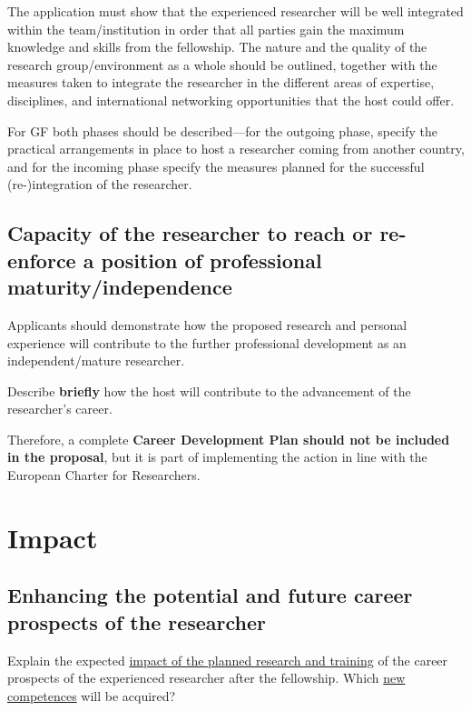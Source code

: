 \noindent
The application must show that the experienced researcher will be well integrated within the team/institution in order that all parties gain the maximum knowledge and skills from the fellowship.
The nature and the quality of the research group/environment as a whole should be outlined, 
together with the measures taken to integrate the researcher in the different areas of expertise, disciplines, and international networking opportunities that the host could offer.

\medskip\noindent
For GF both phases should be described\----for the outgoing phase, specify the practical arrangements in place to host a researcher coming from another country, 
and for the incoming phase specify the measures planned for the successful (re-)integration of the researcher.




\subsection{Capacity of the researcher to reach or re-enforce a position of professional maturity/independence}
\label{sec:excellence_maturity}

Applicants should demonstrate how the proposed research and personal experience will contribute to the further professional development as an independent/mature researcher.

\medskip\noindent
Describe {\bf briefly} how the host will contribute to the advancement of the researcher's career.

\medskip\noindent
Therefore, a complete {\bf Career Development Plan should not be included in the proposal}, 
but it is part of implementing the action in line with the European Charter for Researchers.





\newpage
\section{Impact}
\label{sec:impact}

\subsection{Enhancing the potential and future career prospects of the researcher}
\label{sec:impact_researcher}

Explain the expected \ul{impact of the planned research and training} of the career prospects of the experienced researcher after the fellowship.
Which \ul{new competences} will be acquired?





